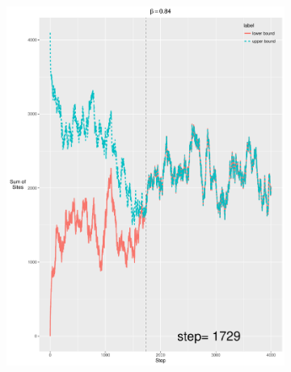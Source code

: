 \documentclass[12pt, oneside]{article}   	%
\begin{document}
\begin{figure}[H]
        \centering
        \begin{subfigure}[b]{0.475\textwidth}
            \centering
            \includegraphics[width=\textwidth, height=0.5\textheight]{084.pdf}
        \end{subfigure}
        \quad
        \begin{subfigure}[b]{0.475\textwidth}
            \centering

\end{subfigure}
\end{figure}
\end{document}
